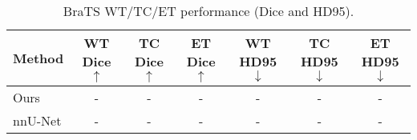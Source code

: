 \begin{table}[h]
\centering
\caption{BraTS WT/TC/ET performance (Dice and HD95).}
\begin{tabular}{lcccccc}
\hline
Method & WT Dice$\uparrow$ & TC Dice$\uparrow$ & ET Dice$\uparrow$ & WT HD95$\downarrow$ & TC HD95$\downarrow$ & ET HD95$\downarrow$ \\
\hline
Ours & - & - & - & - & - & - \\
nnU-Net & - & - & - & - & - & - \\
\hline
\end{tabular}
\label{tab:brats_regions}
\end{table}